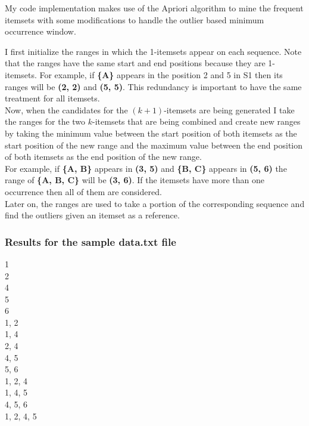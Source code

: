 \documentclass[11pt]{article}
\begin{document}
My code implementation makes use of the Apriori algorithm to mine the frequent itemsets with some modifications to handle the outlier based minimum occurrence window. 

I first initialize the ranges in which the 1-itemsets appear on each sequence. Note that the ranges have the same start and end positions because they are 1-itemsets. For example, if \textbf{\{A\}} appears in the position 2 and 5 in S1 then its ranges will be \textbf{(2, 2)} and \textbf{(5, 5)}. This redundancy is important to have the same treatment for all itemsets.\\

Now, when the candidates for the $(k+1)$-itemsets are being generated I take the ranges for the two $k$-itemsets that are being combined and create new ranges by taking the minimum value between the start position of both itemsets as the start position of the new range and the maximum value between the end position of both itemsets as the end position of the new range.\\
For example, if \textbf{\{A, B\}} appears in \textbf{(3, 5)} and \textbf{\{B, C\}} appears in \textbf{(5, 6)} the range of \textbf{\{A, B, C\}} will be \textbf{(3, 6)}. If the itemsets have more than one occurrence then all of them are considered.\\

Later on, the ranges are used to take a portion of the corresponding sequence and find the outliers given an itemset as a reference.\\

\subsubsection*{Results for the sample data.txt file}
1\\
2\\
4\\
5\\
6\\
1, 2\\
1, 4\\
2, 4\\
4, 5\\
5, 6\\
1, 2, 4\\
1, 4, 5\\
4, 5, 6\\
1, 2, 4, 5\\
\end{document}
